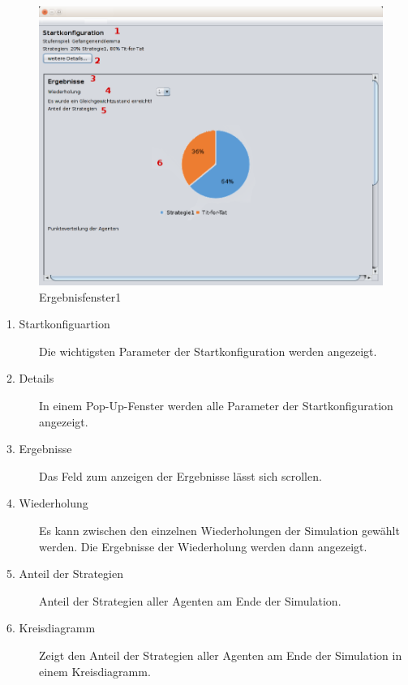 \begin{figure}[hp] 
  \centering
     \includegraphics[width=1.1\textwidth]{GUI_Entwurf/Ergebnisfenster1.png}
  \caption{Ergebnisfenster1}
  \label{fig:Bild7}
\end{figure}

\begin{description}

\item[1. Startkonfiguartion] Die wichtigsten Parameter der Startkonfiguration werden angezeigt.

\item[2. Details] In einem Pop-Up-Fenster werden alle Parameter der Startkonfiguration angezeigt.

\item[3. Ergebnisse] Das Feld zum anzeigen der Ergebnisse lässt sich scrollen.

\item[4. Wiederholung] Es kann zwischen den einzelnen Wiederholungen der Simulation gewählt werden. Die Ergebnisse der Wiederholung werden dann angezeigt.

\item[5. Anteil der Strategien] Anteil der Strategien aller Agenten am Ende der Simulation. 

\item[6. Kreisdiagramm] Zeigt den Anteil der Strategien aller Agenten am Ende der Simulation in einem Kreisdiagramm. 

\end{description}

